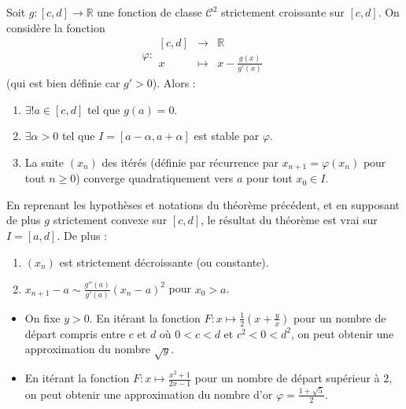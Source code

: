 	\begin{application}
		Soit $g : [c, d] \rightarrow \mathbb{R}$ une fonction de classe $\mathcal{C}^2$ strictement croissante sur $[c, d]$. On considère la fonction
		\[ \varphi :
		\begin{array}{ccc}
			[c, d] &\rightarrow& \mathbb{R} \\
			x &\mapsto& x - \frac{g(x)}{g'(x)}
		\end{array}
		\]
		(qui est bien définie car $g' > 0$). Alors :
		\begin{enumerate}[label=(\roman*)]
			\item $\exists! a \in [c, d]$ tel que $g(a) = 0$.
			\item $\exists \alpha > 0$ tel que $I = [a - \alpha, a + \alpha]$ est stable par $\varphi$.
			\item La suite $(x_n)$ des itérés (définie par récurrence par $x_{n+1} = \varphi(x_n)$ pour tout $n \geq 0$) converge quadratiquement vers $a$ pour tout $x_0 \in I$.
		\end{enumerate}
	\end{application}
	
	\begin{corollary}
		En reprenant les hypothèses et notations du théorème précédent, et en supposant de plus $g$ strictement convexe sur $[c, d]$, le résultat du théorème est vrai sur $I = [a, d]$. De plus :
		\begin{enumerate}[label=(\roman*)]
			\item $(x_n)$ est strictement décroissante (ou constante).
			\item $x_{n+1} - a \sim \frac{g''(a)}{g'(a)} (x_n - a)^2$ pour $x_0 > a$.
		\end{enumerate}
	\end{corollary}
	
	\begin{example}
		\begin{itemize}
			\item On fixe $y > 0$. En itérant la fonction $F : x \mapsto \frac{1}{2} \left( x + \frac{y}{x} \right)$ pour un nombre de départ compris entre $c$ et $d$ où $0 < c < d$ et $c^2 < 0 < d^2$, on peut obtenir une approximation du nombre $\sqrt{y}$.
			\item En itérant la fonction $F : x \mapsto \frac{x^2+1}{2x-1}$ pour un nombre de départ supérieur à $2$, on peut obtenir une approximation du nombre d'or $\varphi = \frac{1+\sqrt{5}}{2}$.
		\end{itemize}
	\end{example}
	
